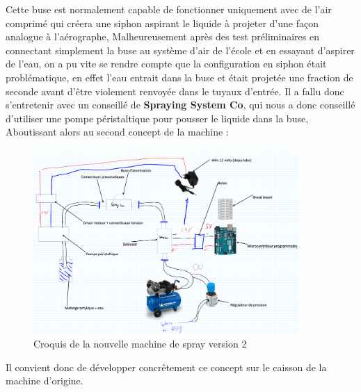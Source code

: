 Cette buse est normalement capable de fonctionner uniquement avec de l'air comprimé qui créera une siphon aspirant le liquide à projeter d'une façon analogue à l'aérographe,
Malheureusement après des test préliminaires en connectant simplement la buse au système d'air de l'école et en essayant d'aspirer de l'eau, on a pu vite se rendre compte que la
configuration en siphon était problématique, en effet l'eau entrait dans la buse et était projetée une fraction de seconde avant d'être violement renvoyée dans le tuyaux d'entrée.
Il a fallu donc s'entretenir avec un conseillé de \textbf{Spraying System Co}, qui nous a donc conseillé d'utiliser une pompe péristaltique pour pousser le liquide dans la buse,
Aboutissant alors au second concept de la machine :
\begin{figure}[H]
    \centering
    \includegraphics[width = 0.9\textwidth]{assets/figures/ameliorations/Croquis_machine_ecran_ver_2.png}
    \caption[Croquis nouvelle machine de spray ver. 2]{Croquis de la nouvelle machine de spray version 2}
    \label{fig:croquis_machine_V2}
\end{figure}


Il convient donc de développer concrêtement ce concept sur le caisson de la machine d'origine.

\newpage
